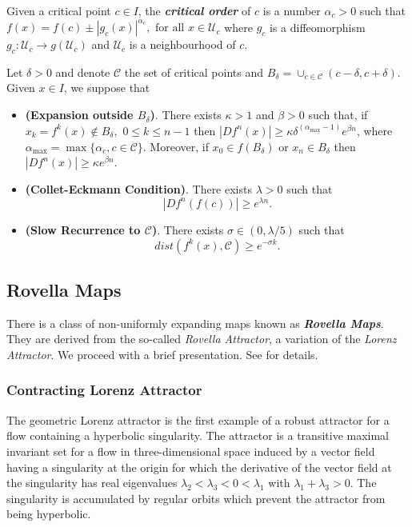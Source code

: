 \documentclass[12pt,a4paper]{amsart}
\theoremstyle{plain}
\begin{document}
Given a critical point $c \in I$, the \textbf{\textit{critical order}} of $c$ is a number $\alpha_{c} > 0$ such that 
$f(x) = f(c) \pm |g_{c}(x)| ^{\alpha_{c}}, \,\, \text{for all} \, \, x \in \mathcal{U}_{c}$ where $g_{c}$ is a diffeomorphism 
$g_{c}: \mathcal{U}_{c} \to g(\mathcal{U}_{c})$ and $\mathcal{U}_{c}$ is a neighbourhood of $c$. 

Let $\delta>0$ and denote $\mathcal{C}$ the set of critical points and $\displaystyle B_{\delta} = \cup_{c \in \mathcal{C}} (c - \delta, c + \delta)$. 
Given $x \in I$, we suppose that

\begin{itemize}
	\item \textbf{(Expansion outside $B_{\delta}$)}.  There exists $\kappa > 1 $ and $\beta > 0$ such that, if $x_{k} = f^{k}(x) \not \in B_{\delta}, \,\, 0 \leq k \leq n-1$ then $|Df^{n}(x)| \geq \kappa \delta^{(\alpha_{\max} -1)}e^{\beta n}$, where $\alpha_{\max} = \max \{\alpha_{c}, c \in \mathcal{C}\}$. Moreover, if $x_{0} \in f(B_{\delta})$ or $x_{n} \in B_{\delta}$ then $|Df^{n}(x)| \geq \kappa e^{\beta n}$.
	
	\item \textbf{(Collet-Eckmann Condition)}. There exists $\lambda > 0$ such that 
	\[
	|Df^{n}(f(c))| \geq e^{\lambda n}.
	\]
	
	\item \textbf{(Slow Recurrence to $\mathcal{C}$)}. There exists $\sigma \in (0, \lambda/5)$ such that 
	\[
	dist(f^{k}(x), \mathcal{C}) \geq e^{-\sigma k}.
	\]
\end{itemize}

\subsection{Rovella Maps}

There is a class of non-uniformly expanding maps known as \textbf{\textit{Rovella Maps}}. They are derived from the so-called \textit{Rovella Attractor},
a variation of the \textit{Lorenz Attractor}. We proceed with a brief presentation. See \cite{AS} for details.

\subsubsection{Contracting Lorenz Attractor}

The geometric Lorenz attractor is the first example of a robust attractor for a flow containing a hyperbolic singularity. The attractor is a transitive maximal invariant
set for a flow in three-dimensional space induced by a vector field having a singularity at the origin for which the derivative of the vector field at the singularity has
real eigenvalues $\lambda_{2} < \lambda_{3} < 0 < \lambda_{1}$ with $\lambda_{1} + \lambda_{3} > 0$. The singularity is accumulated by regular orbits which prevent the 
attractor from being hyperbolic.
\end{document}
